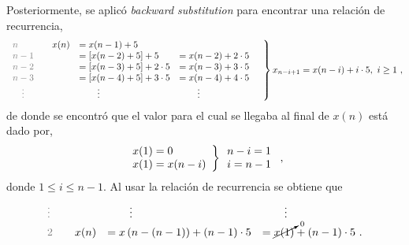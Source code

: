 \begin{enumerate}[label=\textbf{\alph*.}]
\begin{solution}
        Posteriormente, se aplicó \textit{backward substitution} para encontrar una relación de recurrencia,
        \begin{equation*}
            \begin{rcases}
                \begin{array}{l l l l}
                    \txtgray{n} \quad & x(n) & = x(n - 1) + 5 & \\
                    \txtgray{n - 1} \quad & & = \left[ x(n - 2) + 5 \right] + 5 & = x(n-2) + \dprod{2}{5} \\
                    \txtgray{n - 2} \quad & & = \left[ x(n - 3) + 5 \right] + \dprod{2}{5} & = x(n - 3) + \dprod{3}{5} \\
                    \txtgray{n - 3} \quad & & = \left[ x(n - 4) + 5 \right] + \dprod{3}{5} & = x(n - 4) + \dprod{4}{5} \\
                    \quad\txtgray\vdots & & \qquad\vdots & \qquad\vdots
                \end{array} \quad
            \end{rcases}
            x_{n - i + 1} = x(n - i) + \dprod{i}{5},\ i \geq 1\ ,
        \end{equation*}
        de donde se encontró que el valor para el cual se llegaba al final de $x(n)$ está dado por,
        \begin{equation*}
            \begin{rcases}
                \begin{array}{l}
                    x(1) = 0 \\
                    x(1) = x(n - i)
                \end{array}
            \end{rcases}
            \begin{array}{l}
                n - i = 1 \\
                i = n - 1
            \end{array}
            \ ,
        \end{equation*}
        donde $1 \leq i \leq n - 1$. Al usar la relación de recurrencia se obtiene que
        \begin{equation*}
            \begin{array}{l l l l}
                \txtgray\vdots & & \qquad\vdots & \qquad\vdots \\
                \txtgray{2} \quad & x(n) & = x\left(n - (n - 1)\right) + \dprod{(n - 1)}{5} & = \cancelto{0}{x(1)} + \dprod{(n - 1)}{5}\ .
            \end{array}
        \end{equation*}
        

\end{solution}
\end{enumerate}
